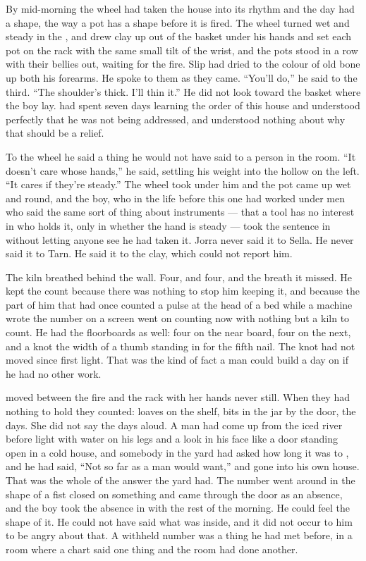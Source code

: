 By mid-morning the wheel had taken the house into its rhythm and the day had a shape, the way a pot has a shape before it is fired. The wheel turned wet and steady in the , and  drew clay up out of the basket under his hands and set each pot on the rack with the same small tilt of the wrist, and the pots stood in a row with their bellies out, waiting for the fire. Slip had dried to the colour of old bone up both his forearms. He spoke to them as they came. “You'll do,” he said to the third. “The shoulder's thick. I'll thin it.” He did not look toward the basket where the boy lay.  had spent seven days learning the order of this house and understood perfectly that he was not being addressed, and understood nothing about why that should be a relief.

To the wheel he said a thing he would not have said to a person in the room. “It doesn't care whose hands,” he said, settling his weight into the hollow on the left. “It cares if they're steady.” The wheel took under him and the pot came up wet and round, and the boy, who in the life before this one had worked under men who said the same sort of thing about instruments --- that a tool has no interest in who holds it, only in whether the hand is steady --- took the sentence in without letting anyone see he had taken it. Jorra never said it to Sella. He never said it to Tarn. He said it to the clay, which could not report him.

The kiln breathed behind the wall. Four, and four, and the breath it missed. He kept the count because there was nothing to stop him keeping it, and because the part of him that had once counted a pulse at the head of a bed while a machine wrote the number on a screen went on counting now with nothing but a kiln to count. He had the floorboards as well: four on the near board, four on the next, and a knot the width of a thumb standing in for the fifth nail. The knot had not moved since first light. That was the kind of fact a man could build a day on if he had no other work.

 moved between the fire and the rack with her hands never still. When they had nothing to hold they counted: loaves on the shelf, bits in the jar by the door, the days. She did not say the days aloud. A man had come up from the iced river before light with water on his legs and a look in his face like a door standing open in a cold house, and somebody in the yard had asked how long it was to , and he had said, “Not so far as a man would want,” and gone into his own house. That was the whole of the answer the yard had. The number went around in the shape of a fist closed on something and came through the door as an absence, and the boy took the absence in with the rest of the morning. He could feel the shape of it. He could not have said what was inside, and it did not occur to him to be angry about that. A withheld number was a thing he had met before, in a room where a chart said one thing and the room had done another.

